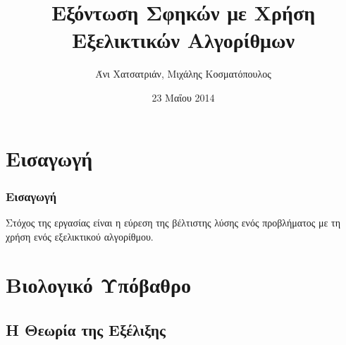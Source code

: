 \documentclass[xetex,mathserif,serif,14pt]{beamer}
\title[Εξόντωση Σφηκών]{Εξόντωση Σφηκών με Χρήση Εξελικτικών Αλγορίθμων} %
\author[Χατσατριάν, Κοσματόπουλος]{Άνι Χατσατριάν, Μιχάλης Κοσματόπουλος} %
\institute[ΑΤΕΙΘ] %
{
Αλεξάνδρειο Τεχνολογικό Εκπαιδευτικό Ίδρυμα Θεσσαλονίκης \\ %
\medskip
\textit{\{achatsat, mkosm\}@it.teithe.gr} %
}
\date{23 Μαΐου 2014} %
\begin{document}
\begin{frame}
\titlepage %
\end{frame}



\section{Εισαγωγή} %

\begin{frame}
\frametitle{Εισαγωγή}
Στόχος της εργασίας είναι η εύρεση της βέλτιστης λύσης ενός προβλήματος με τη χρήση ενός εξελικτικού αλγορίθμου.

\end{frame}

\section{Βιολογικό Υπόβαθρο}

\subsection{Η Θεωρία της Εξέλιξης}
\end{document}
